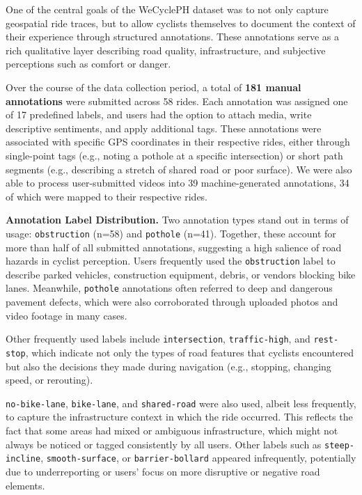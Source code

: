 One of the central goals of the WeCyclePH dataset was to not only capture geospatial ride traces, but to allow cyclists themselves to document the context of their experience through structured annotations. These annotations serve as a rich qualitative layer describing road quality, infrastructure, and subjective perceptions such as comfort or danger.

Over the course of the data collection period, a total of \textbf{181 manual annotations} were submitted across 58 rides. Each annotation was assigned one of 17 predefined labels, and users had the option to attach media, write descriptive sentiments, and apply additional tags. These annotations were associated with specific GPS coordinates in their respective rides, either through single-point tags (e.g., noting a pothole at a specific intersection) or short path segments (e.g., describing a stretch of shared road or poor surface). We were also able to process user-submitted videos into 39 machine-generated annotations, 34 of which were mapped to their respective rides.

\vspace{0.3cm}
\noindent\textbf{Annotation Label Distribution.}
Two annotation types stand out in terms of usage: \texttt{obstruction} (n=58) and \texttt{pothole} (n=41). Together, these account for more than half of all submitted annotations, suggesting a high salience of road hazards in cyclist perception. Users frequently used the \texttt{obstruction} label to describe parked vehicles, construction equipment, debris, or vendors blocking bike lanes. Meanwhile, \texttt{pothole} annotations often referred to deep and dangerous pavement defects, which were also corroborated through uploaded photos and video footage in many cases.

Other frequently used labels include \texttt{intersection}, \texttt{traffic-high}, and \texttt{rest-stop}, which indicate not only the types of road features that cyclists encountered but also the decisions they made during navigation (e.g., stopping, changing speed, or rerouting).

\texttt{no-bike-lane}, \texttt{bike-lane}, and \texttt{shared-road} were also used, albeit less frequently, to capture the infrastructure context in which the ride occurred. This reflects the fact that some areas had mixed or ambiguous infrastructure, which might not always be noticed or tagged consistently by all users. Other labels such as \texttt{steep-incline}, \texttt{smooth-surface}, or \texttt{barrier-bollard} appeared infrequently, potentially due to underreporting or users' focus on more disruptive or negative road elements.

